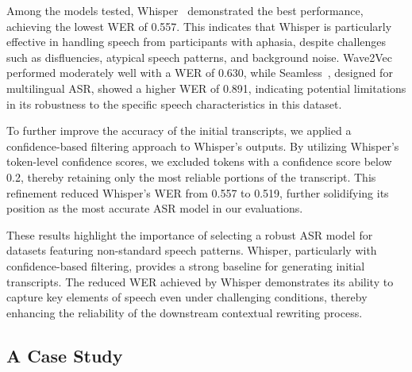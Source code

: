 Among the models tested, Whisper~\cite{radford2023robust} demonstrated the best performance, achieving the lowest WER of 0.557. This indicates that Whisper is particularly effective in handling speech from participants with aphasia, despite challenges such as disfluencies, atypical speech patterns, and background noise. Wave2Vec~\cite{baevski2020wav2vec} performed moderately well with a WER of 0.630, while Seamless~\cite{barrault2023seamlessm4t}, designed for multilingual ASR, showed a higher WER of 0.891, indicating potential limitations in its robustness to the specific speech characteristics in this dataset.

To further improve the accuracy of the initial transcripts, we applied a confidence-based filtering approach to Whisper's outputs. By utilizing Whisper’s token-level confidence scores, we excluded tokens with a confidence score below 0.2, thereby retaining only the most reliable portions of the transcript. This refinement reduced Whisper's WER from 0.557 to 0.519, further solidifying its position as the most accurate ASR model in our evaluations.

These results highlight the importance of selecting a robust ASR model for datasets featuring non-standard speech patterns. Whisper, particularly with confidence-based filtering, provides a strong baseline for generating initial transcripts. The reduced WER achieved by Whisper demonstrates its ability to capture key elements of speech even under challenging conditions, thereby enhancing the reliability of the downstream contextual rewriting process.


\subsection{A Case Study}

